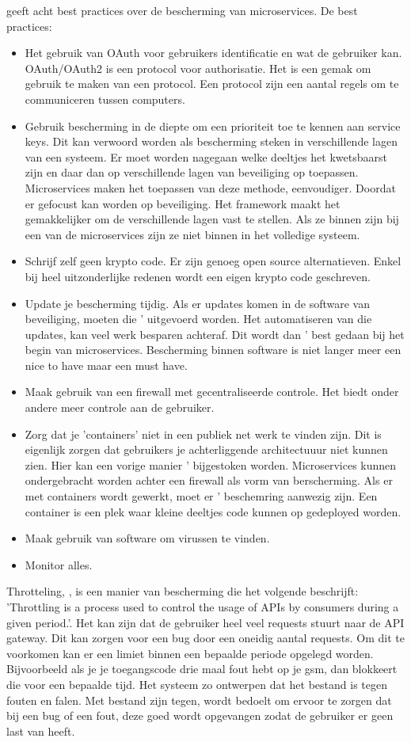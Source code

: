 \textcite{Troisi2019} geeft acht best practices over de bescherming van microservices. 
De best practices:
\begin{itemize}
	\item Het gebruik van OAuth voor gebruikers identificatie en wat de gebruiker kan. OAuth/OAuth2 is een protocol voor authorisatie. Het is een gemak om gebruik te maken van een protocol. Een protocol zijn een aantal regels om te communiceren tussen computers. 
	\item Gebruik bescherming in de diepte om een prioriteit toe te kennen aan service keys.  Dit kan verwoord worden als bescherming steken in verschillende lagen van een systeem. Er moet worden nagegaan  welke deeltjes het kwetsbaarst zijn en daar dan op verschillende lagen van beveiliging op toepassen. 
	Microservices maken het toepassen van deze methode, eenvoudiger. Doordat er gefocust kan worden op beveiliging. Het framework maakt het gemakkelijker om de verschillende lagen vast te stellen. Als ze binnen zijn bij een van de microservices zijn ze niet binnen in het volledige systeem. 
	\item Schrijf zelf geen krypto code. Er zijn genoeg open source alternatieven. Enkel bij heel uitzonderlijke redenen wordt een eigen krypto code geschreven. 
	\item Update je bescherming tijdig. Als er updates komen in de software van beveiliging, moeten die ' uitgevoerd worden. Het automatiseren van die updates, kan veel  werk besparen achteraf. Dit wordt dan ' best gedaan bij het begin van microservices. Bescherming binnen software is niet langer meer een nice to have maar een must have. 
	\item Maak gebruik van een firewall met gecentraliseerde controle. Het biedt onder andere meer controle aan de gebruiker.
	\item Zorg dat je 'containers' niet in een publiek net werk te vinden zijn. Dit is eigenlijk zorgen dat gebruikers je achterliggende architectuuur niet kunnen zien. Hier kan een vorige manier ' bijgestoken worden. Microservices kunnen ondergebracht worden achter een firewall als vorm van berscherming.  Als er met containers wordt gewerkt, moet er ' beschemring aanwezig zijn. Een container is een plek waar kleine deeltjes code kunnen op gedeployed worden. 
	\item Maak gebruik van software om virussen te vinden.
	\item Monitor alles.
\end{itemize}

Throtteling, \textcite{Cavalcanti2018}, is een manier van bescherming die het volgende beschrijft: 'Throttling is a process used to control the usage of APIs by consumers during a given period.'. Het kan zijn dat de gebruiker heel veel requests stuurt naar de API gateway. Dit kan zorgen voor een bug door een oneidig aantal requests. Om dit te voorkomen kan er een limiet binnen een bepaalde periode opgelegd worden. Bijvoorbeeld als je je toegangscode drie maal fout hebt op je gsm, dan blokkeert die voor een bepaalde tijd. Het systeem zo ontwerpen dat het bestand is tegen fouten en falen. Met bestand zijn tegen, wordt bedoelt om ervoor te zorgen dat bij een bug of een fout, deze goed wordt opgevangen zodat de gebruiker er geen last van heeft. 

